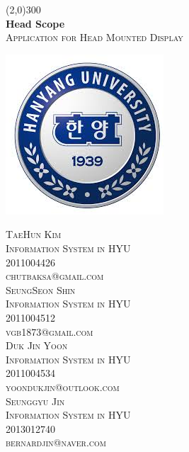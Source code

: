 \documentclass[12pt]{article}
\begin{document}
\begin{titlepage}
\begin{center}
\line(2,0){300}\\	
\huge{\bfseries Head Scope} \\
\textsc{\large Application for Head Mounted Display}\\[2\baselineskip]
\end{center} 

\center
\includegraphics{Unknown}
\\ [15\baselineskip]



\begin{multicols}{2} \noindent 
\textsc {\noindent TaeHun Kim\\ 
Information System in HYU \\
 2011004426 \\ 
 chutbaksa@gmail.com}\\[1\baselineskip]
\textsc{SeungSeon Shin \\
 Information System in HYU 
 \\ 2011004512 \\ 
 vgb1873@gmail.com}\\[1\baselineskip]
\textsc{Duk Jin Yoon \\
Information System in HYU \\
2011004534 \\
yoondukjin@outlook.com} \\[1\baselineskip]
\textsc{Seunggyu Jin \\ 
Information System in HYU \\
2013012740 \\
bernardjin@naver.com}
\end{multicols}
\end{titlepage}
\end{document}
